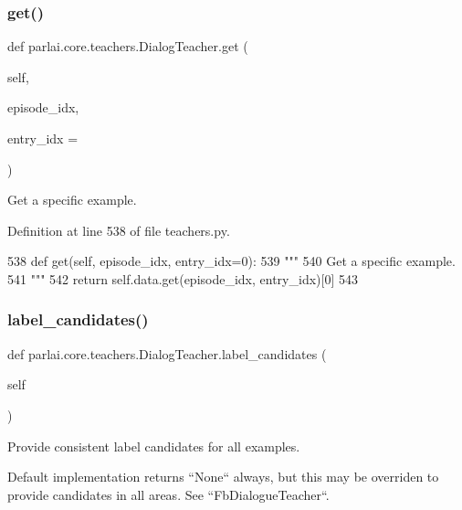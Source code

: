 \subsubsection{\texorpdfstring{get()}{get()}}
{\footnotesize\ttfamily def parlai.\+core.\+teachers.\+Dialog\+Teacher.\+get (\begin{DoxyParamCaption}\item[{}]{self,  }\item[{}]{episode\+\_\+idx,  }\item[{}]{entry\+\_\+idx = {} }\end{DoxyParamCaption})}

\begin{DoxyVerb}Get a specific example.
\end{DoxyVerb}
 

Definition at line 538 of file teachers.\+py.


\begin{DoxyCode}
538     \textcolor{keyword}{def }get(self, episode\_idx, entry\_idx=0):
539         \textcolor{stringliteral}{"""}
540 \textcolor{stringliteral}{        Get a specific example.}
541 \textcolor{stringliteral}{        """}
542         \textcolor{keywordflow}{return} self.data.get(episode\_idx, entry\_idx)[0]
543 
\end{DoxyCode}
\mbox{\label{classparlai_1_1core_1_1teachers_1_1DialogTeacher_a50649105cc9d00bcaa860290d804eac9}} 
\subsubsection{\texorpdfstring{label\+\_\+candidates()}{label\_candidates()}}
{\footnotesize\ttfamily def parlai.\+core.\+teachers.\+Dialog\+Teacher.\+label\+\_\+candidates (\begin{DoxyParamCaption}\item[{}]{self }\end{DoxyParamCaption})}

\begin{DoxyVerb}Provide consistent label candidates for all examples.

Default implementation returns ``None`` always, but this may be overriden to
provide candidates in all areas. See ``FbDialogueTeacher``.
\end{DoxyVerb}
 


